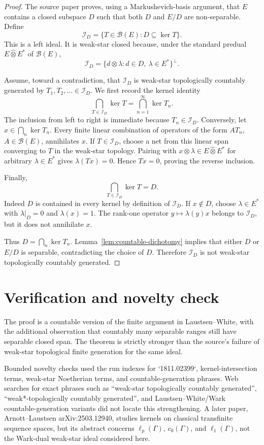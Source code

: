 \documentclass[11pt]{article}
\newcommand{\B}{\mathscr B}
\newcommand{\I}{\mathscr I}
\begin{document}
\begin{proof}
The source paper proves, using a Markushevich-basis argument, that \(E\) contains a closed subspace \(D\) such that both \(D\) and \(E/D\) are non-separable.  Define
\[
        \I_D=\{T\in\B(E):D\subseteq\ker T\}.
\]
This is a left ideal.  It is weak-star closed because, under the standard predual \(E\widehat\otimes E^*\) of \(\B(E)\),
\[
        \I_D=\{d\otimes \lambda:d\in D,\ \lambda\in E^*\}^{\perp}.
\]

Assume, toward a contradiction, that \(\I_D\) is weak-star topologically countably generated by \(T_1,T_2,\ldots\in\I_D\).  We first record the kernel identity
\[
        \bigcap_{T\in\I_D}\ker T=\bigcap_{n=1}^\infty \ker T_n.
\]
The inclusion from left to right is immediate because \(T_n\in\I_D\).  Conversely, let \(x\in\bigcap_n\ker T_n\).  Every finite linear combination of operators of the form \(A T_n\), \(A\in\B(E)\), annihilates \(x\).  If \(T\in\I_D\), choose a net from this linear span converging to \(T\) in the weak-star topology.  Pairing with \(x\otimes\lambda\in E\widehat\otimes E^*\) for arbitrary \(\lambda\in E^*\) gives \(\lambda(Tx)=0\).  Hence \(Tx=0\), proving the reverse inclusion.

Finally,
\[
        \bigcap_{T\in\I_D}\ker T=D.
\]
Indeed \(D\) is contained in every kernel by definition of \(\I_D\).  If \(x\notin D\), choose \(\lambda\in E^*\) with \(\lambda|_D=0\) and \(\lambda(x)=1\).  The rank-one operator \(y\mapsto \lambda(y)x\) belongs to \(\I_D\), but it does not annihilate \(x\).

Thus \(D=\bigcap_n\ker T_n\).  Lemma~\ref{lem:countable-dichotomy} implies that either \(D\) or \(E/D\) is separable, contradicting the choice of \(D\).  Therefore \(\I_D\) is not weak-star topologically countably generated.
\end{proof}

\section*{Verification and novelty check}

The proof is a countable version of the finite argument in Laustsen--White, with the additional observation that countably many separable ranges still have separable closed span.  The theorem is strictly stronger than the source's failure of weak-star topological finite generation for the same ideal.

Bounded novelty checks used the run indexes for `1811.02399`, kernel-intersection terms, weak-star Noetherian terms, and countable-generation phrases.  Web searches for exact phrases such as ``weak-star topologically countably generated'', ``weak*-topologically countably generated'', and Laustsen--White/Wark countable-generation variants did not locate this strengthening.  A later paper, Arnott--Laustsen arXiv:2503.12940, studies kernels on classical transfinite sequence spaces, but its abstract concerns \(\ell_p(\Gamma)\), \(c_0(\Gamma)\), and \(\ell_1(\Gamma)\), not the Wark-dual weak-star ideal considered here.
\end{document}
